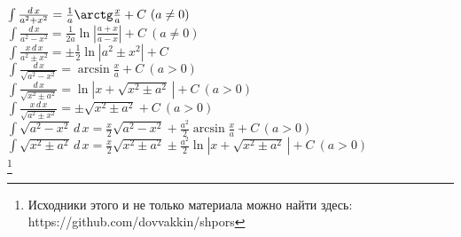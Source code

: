\documentclass[oneside,final,8pt]{extreport}
\begin{document}
\scriptsize
\noindent
\( \int \frac{d \, x}{a^2 + x^2}  = \frac{1}{a}\arctg\frac{x}{a} + C \ (a \ne 0)\) \\
%
\( \int \frac{d \, x}{a^2 - x^2} = \frac{1}{2a} \ln|\frac{a + x}{a - x}| + C \ (a \ne 0) \) \\
%
\( \int\frac{x \, d \, x}{a^2 \pm x^2} = \pm \frac{1}{2} \ln |a^2 \pm x^2| + C \) \\
%
\( \int\frac{d \, x}{\sqrt{a^2 - x^2}}  = \arcsin{\frac{x}{a}} + C \ (a > 0)\) \\
%
\( \int \frac{d \, x}{\sqrt{x^2 \pm a^2}} = \ln|x + \sqrt{x^2 \pm a^2} \, | + C \ (a > 0) \) \\
%
\( \int \frac{x \, d \, x}{\sqrt{a^2 \pm x^2}} = \pm \sqrt{x^2 \pm a^2} + C \ (a > 0) \) \\
%
\( \int \sqrt{a^2 - x^2} \, d \, x = \frac{x}{2}\sqrt{a^2 - x^2} + \frac{a^2}{2}\arcsin \frac{x}{a} + C \, (a > 0) \) \\
%
\( \int \sqrt{x^2 \pm a^2} \, d \, x  = \frac{x}{2} \sqrt{x^2 \pm a^2} \pm \frac{a^2}{2} \ln |x + \sqrt{x^2 \pm a^2} \, | + C \ (a > 0)\) \\


\let\thefootnote\relax\footnote{\normalsize Исходники этого и не только материала можно найти здесь: https://github.com/dovvakkin/shpors}
\end{document}
